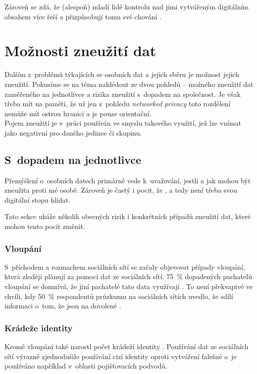 Zároveň se zdá, že (alespoň) mladí lidé kontrolu nad jimi vytvářeným digitálním obsahem více řeší a přizpůsobují tomu své chování \citep{youth-online-behavior}.

\section{Možnosti zneužití dat}
Dalším z~problémů týkajících se osobních dat a jejich sběru je možnost jejich zneužití. Pokusíme se na téma nahlédout ze dvou pohledů -- možného zneužití dat zaměřeného na jednotlivce a rizika zneužití s~dopadem na společnost. Je však třeba mít na paměti, že už jen z~pohledu \textit{networked privacy} toto rozdělení nemůže mít ostrou hranici a je pouze orientační.\\
Pojem zneužití je v~práci používán ve smyslu takového využití, jež lze vnímat jako negativní pro daného jedince či skupinu.

\subsection{S~dopadem na jednotlivce}
Přemýšlení o~osobních datech primárně vede k~uvažování, jestli a jak mohou být zneužita proti mé osobě. Zároveň je častý i pocit, že , a tedy není třeba svou digitální stopu hlídat.

Tato sekce ukáže několik obecných rizik i konkrétních případů zneužití dat, které mohou tento pocit změnit.

\subsubsection*{Vloupání}
S~příchodem a rozmachem sociálních sítí se začaly objevovat případy vloupání, která zloději plánují za pomoci dat ze sociálních sítí. 75~\% dopadených pachatelů vloupání se domnívá, že jiní pachatelé tato data využívají \citep{burglary}.
To není překvapivé ve chvíli, kdy 50~\% respondentů průzkumu na sociálních sítích uvedlo, že sdílí informaci o~tom, že jsou na dovolené \citep{burglary}. 

\subsubsection*{Krádeže identity}
Kromě vloupání také narostl počet krádeží identity \citep{identity-theft-rise}.
Používání dat ze sociálních sítí výrazně zjednodušilo používání cizí identity oproti vytváření falešné a~je používáno například v~oblasti pojišťovacích podvodů. 


